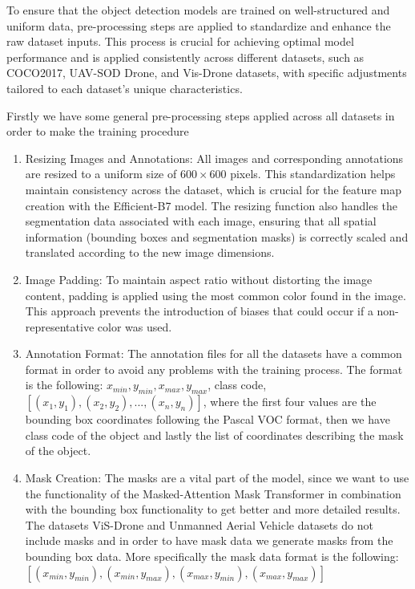 To ensure that the object detection models are trained on well-structured and uniform data, pre-processing steps are applied to standardize and enhance the 
raw dataset inputs. This process is crucial for achieving optimal model performance and is applied consistently across different datasets, such as COCO2017, 
UAV-SOD Drone, and Vis-Drone datasets, with specific adjustments tailored to each dataset's unique characteristics.

Firstly we have some general pre-processing steps applied across all datasets in order to make the training procedure 

\begin{enumerate}
    \item Resizing Images and Annotations: All images and corresponding annotations are resized to a uniform size of \(600 \times 600\) pixels. 
    This standardization helps maintain consistency across the dataset, which is crucial for the feature map creation with the Efficient-B7 model. 
    The resizing function also handles the segmentation data associated with each image, ensuring that all spatial information (bounding boxes and 
    segmentation masks) is correctly scaled and translated according to the new image dimensions.

    \item Image Padding: To maintain aspect ratio without distorting the image content, padding is applied using the most common color found in the image. 
    This approach prevents the introduction of biases that could occur if a non-representative color was used.

    \item Annotation Format: The annotation files for all the datasets have a common format in order to avoid any problems with the training process. The format 
    is the following: $x_{min}, y_{min}, x_{max}, y_{max}$, class code, $[(x_1, y_1), (x_2, y_2), ..., (x_n, y_n)]$, where the first four 
    values are the bounding box coordinates following the Pascal VOC format, then we have class code of the object and lastly the 
    list of coordinates describing the mask of the object.

    \item Mask Creation: The masks are a vital part of the model, since we want to use the functionality of the Masked-Attention Mask Transformer 
    in combination with the bounding box functionality to get better and more detailed results. The datasets ViS-Drone and 
    Unmanned Aerial Vehicle datasets do not include masks and in order to have mask data we generate masks from the bounding box 
    data. More specifically the mask data format is the following: \\
    $[(x_{min}, y_{min}), (x_{min}, y_{max}), (x_{max}, y_{min}), (x_{max}, y_{max})]$


\end{enumerate}
